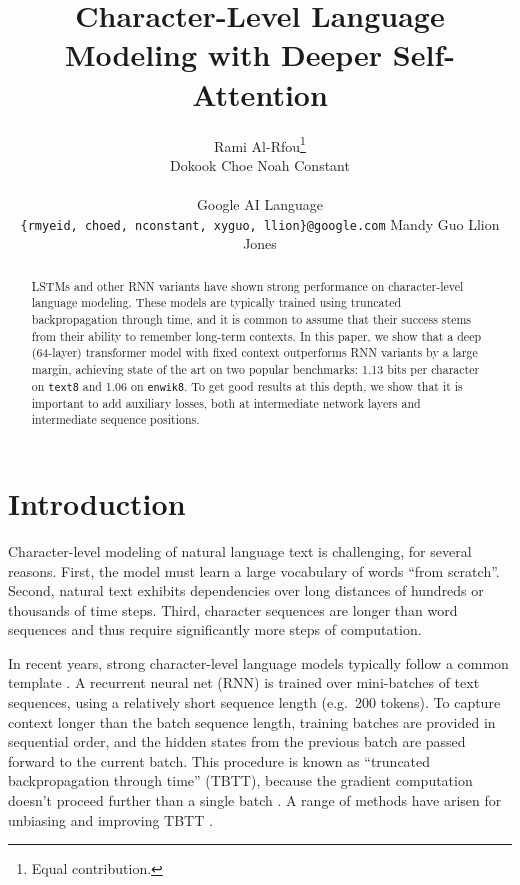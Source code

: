 \documentclass[letterpaper]{article}
\title{Character-Level Language Modeling with Deeper Self-Attention}
\author{Rami Al-Rfou\thanks{Equal contribution.}\\
 \And
 Dokook Choe\footnotemark[1]
 \And 
 Noah Constant\footnotemark[1]
 \\\hspace{0.5pt}
 \\
 Google \textsc{AI} Language
 \\
 \texttt{\{rmyeid, choed, nconstant, xyguo, llion\}@google.com}
 \And
 Mandy Guo\footnotemark[1]
 \And
 Llion Jones\footnotemark[1]
}
\newcommand{\texteight}{\texttt{text8}}
\newcommand{\enwikeight}{\texttt{enwik8}}
\begin{document}
\maketitle

\begin{abstract}

LSTMs and other RNN variants have shown strong performance on character-level language modeling.
These models are typically trained using truncated backpropagation through time, and it is common to assume that their success stems from their ability to remember long-term contexts.
In this paper, we show that a deep (64-layer) transformer model \cite{NIPS2017_7181} with fixed context outperforms RNN variants by a large margin, achieving state of the art on two popular benchmarks: 1.13 bits per character on \texteight{} and 1.06 on \enwikeight{}.
To get good results at this depth, we show that it is important to add auxiliary losses, both at intermediate network layers and intermediate sequence positions.

\end{abstract}

\section{Introduction}

Character-level modeling of natural language text is challenging, for several reasons.
First, the model must learn a large vocabulary of words ``from scratch''.
Second, natural text exhibits dependencies over long distances of hundreds or thousands of time steps.
Third, character sequences are longer than word sequences and thus require significantly more steps of computation.

In recent years, strong character-level language models typically follow a common template \cite{conf/interspeech/MikolovKBCK10,extensionsmikolov,sundermeyer2012lstm}.
A recurrent neural net (RNN) is trained over mini-batches of text sequences, using a relatively short sequence length (e.g.~200 tokens).
To capture context longer than the batch sequence length, training batches are provided in sequential order, and the hidden states from the previous batch are passed forward to the current batch.
This procedure is known as ``truncated backpropagation through time'' (TBTT), because the gradient computation doesn't proceed further than a single batch \cite{werbos1990backpropagation}.
A range of methods have arisen for unbiasing and improving TBTT \cite{tallec2017unbiasing,ke2017sparse}.
\end{document}
